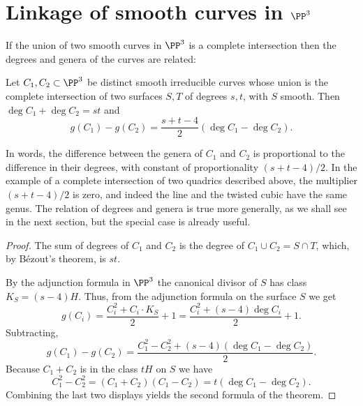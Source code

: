 \section{Linkage of smooth curves in $\PP^3$}
\label{SLinkage}\label{linkage section}

If the union of two smooth curves in $\PP^3$ is a 
complete intersection
%
then the degrees and genera
of the curves are related:

\begin{theorem}\label{liaison genus formula-first version}
Let $C_1, C_2\subset \PP^3$ be distinct smooth irreducible curves
whose union is the complete
intersection
of two surfaces $S,T$
of degrees $s,t$,
with $S$ smooth.
Then $ \deg C_1+\deg C_2 = st$ and
$$
g(C_1) - g(C_2) = \frac{s+t-4}{2}(\deg C_1-\deg C_2).
$$
\end{theorem}

In words, the difference between the genera of $C_1$ and $C_2$
is proportional to the difference in their degrees, with constant of
proportionality $(s+t-4)/2$.
In the
example of a
complete
intersection of two quadrics
described above, the multiplier $(s+t-4)/2$
is zero,
and indeed the line
and the twisted cubic have the same genus.
The relation of degrees and genera is true more generally, as we shall
see in the next section, but the special
case is already useful.

\begin{proof}
The sum of degrees of $C_1$ and $C_2$ is the degree of $ C_1\cup C_2=S\cap T$,
which, by B\'ezout's theorem, is $st$.

By the
adjunction formula
%
in $\PP^3$ the
canonical divisor
of $S$ has
%
%
class $K_S = (s-4)H$. Thus, from the
adjunction formula on the surface $S$ we get
$$
g(C_i) = \frac{C_i^2+C_i\cdot K_S}{2}+1 = \frac{C_i^2+(s-4) \deg
C_i}{2}+1.
$$
Subtracting,
$$
g(C_1)-g(C_2) = \frac{C_1^2-C_2^2+(s-4) (\deg C_1-\deg C_2)} {2}.
$$
Because $C_1+C_2$ is in the class $tH$ on $S$ we have
$$
C_1^2-C_2^2 = (C_1+C_2)(C_1-C_2) = t(\deg C_1-\deg C_2).
$$
Combining the last two displays yields
the second formula
of the theorem.
\end{proof}


